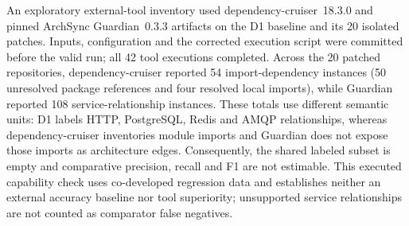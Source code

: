An exploratory external-tool inventory used dependency-cruiser~18.3.0 and pinned ArchSync Guardian~0.3.3 artifacts on the D1 baseline and its 20 isolated patches. Inputs, configuration and the corrected execution script were committed before the valid run; all 42 tool executions completed. Across the 20 patched repositories, dependency-cruiser reported 54 import-dependency instances (50 unresolved package references and four resolved local imports), while Guardian reported 108 service-relationship instances. These totals use different semantic units: D1 labels HTTP, PostgreSQL, Redis and AMQP relationships, whereas dependency-cruiser inventories module imports and Guardian does not expose those imports as architecture edges. Consequently, the shared labeled subset is empty and comparative precision, recall and F1 are not estimable. This executed capability check uses co-developed regression data and establishes neither an external accuracy baseline nor tool superiority; unsupported service relationships are not counted as comparator false negatives.
